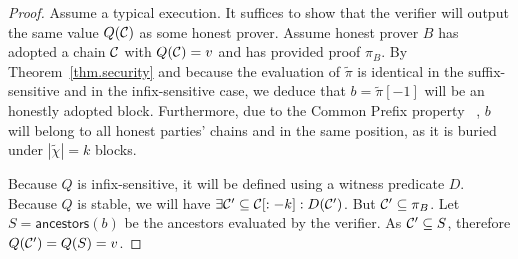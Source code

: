 \begin{proof}
Assume a typical execution. It suffices to show that the verifier will output
the same value $Q(\mathcal{C})$ as some honest prover. Assume honest prover $B$ has
adopted a chain $\mathcal{C}$ with $Q(\mathcal{C}) = v$ and has provided proof
$\pi_B$. By Theorem~\ref{thm.security} and because the evaluation of $\tilde\pi$
is identical in the suffix-sensitive and in the infix-sensitive case, we deduce
that $b = \tilde\pi[-1]$ will be an honestly adopted block. Furthermore, due to
the Common Prefix property~ \cite{backbone}, $b$ will belong to all honest
parties' chains and in the same position, as it is buried under $|\tilde\chi| =
k$ blocks.

Because $Q$ is infix-sensitive, it will be defined using a witness predicate
$D$. Because $Q$ is stable, we will have $\exists \mathcal{C}' \subseteq
\mathcal{C}[:-k]: D(\mathcal{C}')$. But $\mathcal{C}' \subseteq \pi_B$. Let $S =
\textsf{ancestors}(b)$ be the ancestors evaluated by the verifier. As $\mathcal{C}'
\subseteq S$, therefore $Q(\mathcal{C}') = Q(S) = v$.
\Qed
\end{proof}
